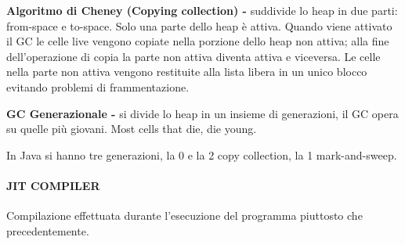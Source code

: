 \documentclass[a4paper, 12pt]{article}
\begin{document}
\textbf{Algoritmo di Cheney (Copying collection) -} suddivide lo heap in due parti:
from-space e to-space. Solo una parte dello heap è attiva. Quando viene attivato il GC le
celle live vengono copiate nella porzione dello heap non attiva; alla fine dell'operazione
di copia la parte non attiva diventa attiva e viceversa. Le celle nella parte non attiva
vengono restituite alla lista libera in un unico blocco evitando problemi di frammentazione.

\textbf{GC Generazionale -} si divide lo heap in un insieme di generazioni, il GC opera su
quelle più giovani. Most cells that die, die young.

\noindent In Java si hanno tre generazioni, la 0 e la 2 copy collection, la 1 mark-and-sweep.

\paragraph{JIT COMPILER}
Compilazione effettuata durante l'esecuzione del programma piuttosto che precedentemente.
\end{document}
